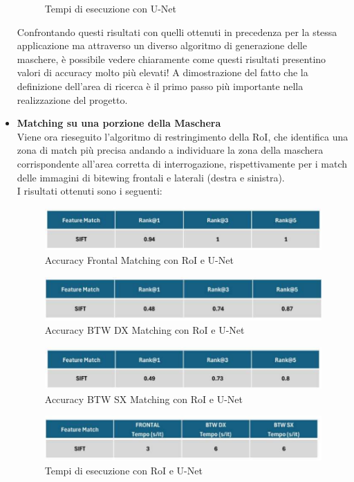 \documentclass[12pt,a4paper,openright,twoside]{book}
\begin{document}
\begin{itemize}
\begin{figure}[H]
    	\caption{Tempi di esecuzione con U-Net}
	\label{fig:tempi4}
\end{figure}
Confrontando questi risultati con quelli ottenuti in precedenza per la stessa applicazione ma attraverso un diverso algoritmo di generazione delle maschere, è possibile vedere chiaramente come questi risultati presentino valori di accuracy molto più elevati! A dimostrazione del fatto che la definizione dell'area di ricerca è il primo passo più importante nella realizzazione del progetto.
\item \textbf{Matching su una porzione della Maschera}\\
Viene ora rieseguito l'algoritmo di restringimento della RoI, che identifica una zona di match più precisa andando a individuare la zona della maschera corrispondente all'area corretta di interrogazione, rispettivamente per i match delle immagini di bitewing frontali e laterali (destra e sinistra).\\
I risultati ottenuti sono i seguenti:
\begin{figure}[H]
	\centering
	\includegraphics{figures/frontal5.pdf}
   	\caption{Accuracy Frontal Matching con RoI e U-Net}
	\label{fig:frontal5}
\end{figure}
\begin{figure}[H]
	\centering
	\includegraphics{figures/dx5.pdf}
    	\caption{Accuracy BTW DX Matching con RoI e U-Net}
	\label{fig:dx5}
\end{figure}
\begin{figure}[H]
	\centering
	\includegraphics{figures/sx5.pdf}
    	\caption{Accuracy BTW SX Matching con RoI e U-Net}
	\label{fig:sx5}
\end{figure}
\begin{figure}[H]
	\centering
	\includegraphics{figures/tempi5.pdf}
    	\caption{Tempi di esecuzione con RoI e U-Net}
	\label{fig:tempi5}
\end{figure}
\end{itemize}
\end{document}
